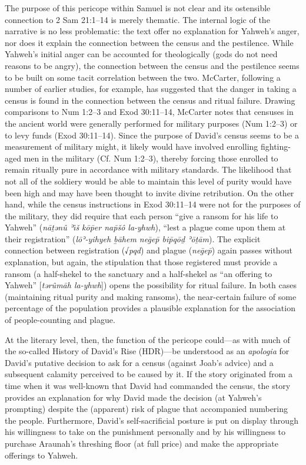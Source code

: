The purpose of this pericope within Samuel is not clear and its
ostensible connection to 2 Sam 21:1--14 is merely
thematic.\autocite[509]{mccarter1984} The internal logic of the
narrative is no less problematic: the text offer no explanation for
Yahweh's anger, nor does it explain the connection between the census
and the pestilence. While Yahweh's initial anger can be accounted for
theologically (gods do not need reasons to be angry), the connection
between the census and the pestilence seems to be built on some tacit
correlation between the two. McCarter, following a number of earlier
studies, for example, has suggested that the danger in taking a census
is found in the connection between the census and ritual failure.
Drawing comparisons to Num 1:2--3 and Exod 30:11--14, McCarter notes
that censuses in the ancient world were generally performed for military
purposes (Num 1:2--3) or to levy funds (Exod 30:11--14). Since the
purpose of David's census seems to be a measurement of military might,
it likely would have involved enrolling fighting-aged men in the
military (Cf. Num 1:2--3), thereby forcing those enrolled to remain
ritually pure in accordance with military standards. The likelihood that
not all of the soldiery would be able to maintain this level of purity
would have been high and may have been thought to invite divine
retribution. On the other hand, while the census instructions in Exod
30:11--14 were not for the purposes of the military, they did require
that each person ``give a ransom for his life to Yahweh'' (\emph{nāṯənû
ʾı̂š kōp̄er nap̄šô la-yhwh}), ``lest a plague come upon them at their
registration'' (\emph{lōʾ-yihyeh ḇāhem neḡep̄ bip̄qōḏ ʾōṯām}). The
explicit connection between registration (√\emph{pqd}) and plague
(\emph{neḡep̄}) again passes without explanation, but again, the
stipulation that those registered must provide a ransom (a half-shekel
to the sanctuary and a half-shekel as ``an offering to Yahweh''
{[}\emph{tərûmāh la-yhwh}{]}) opens the possibility for ritual failure.
In both cases (maintaining ritual purity and making ransoms), the
near-certain failure of some percentage of the population provides a
plausible explanation for the association of people-counting and plague.

At the literary level, then, the function of the pericope could---as
with much of the so-called History of David's Rise (HDR)---be understood
as an \emph{apologia} for David's putative decision to ask for a census
(against Joab's advice) and a subsequent calamity perceived to be caused
by it. If the story originated from a time when it was well-known that
David had commanded the census, the story provides an explanation for
why David made the decision (at Yahweh's prompting) despite the
(apparent) risk of plague that accompanied numbering the
people.\autocite[518]{mccarter1984} Furthermore, David's
self-sacrificial posture is put on display through his willingness to
take on the punishment personally and by his willingness to purchase
Araunah's threshing floor (at full price) and make the appropriate
offerings to Yahweh.


